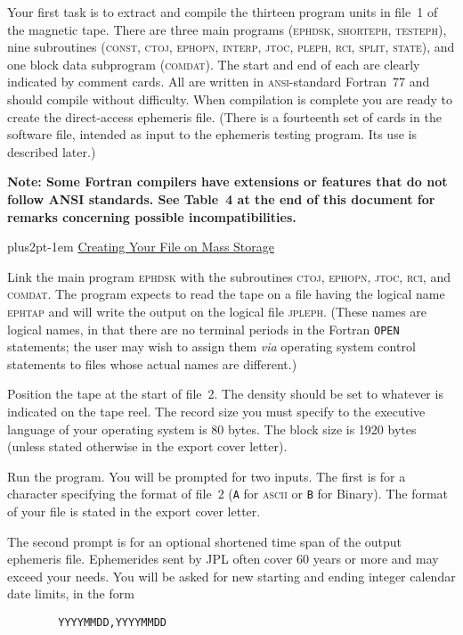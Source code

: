 \documentclass[twoside,11pt]{article}
\renewcommand{\_}{\texttt{\symbol{95}}}
\newcommand{\hdg}[1]{\vskip4pt plus2pt\leavevmode\kern-1em \underline{\large{#1}}\par}
\newcommand{\hdg}[1]{\subsection*{{#1}}}
\begin{document}
Your first task is to extract and compile the thirteen program
units in file~1 of the magnetic tape. There are three main programs
(\textsc{ephdsk, shorteph, testeph}), nine subroutines (\textsc{const,
ctoj, ephopn, interp, jtoc, pleph, rci, split, state}), and one block
data subprogram (\textsc{comdat}).  The start and end of each are clearly
indicated by comment cards. All are written in \textsc{ansi}-standard
Fortran~77 and should compile without difficulty. When compilation
is complete you are ready to create the direct-access ephemeris file.
(There is a fourteenth set of cards in the software file, intended as
input to the ephemeris testing program. Its use is described later.)

\textbf{Note: Some Fortran compilers have extensions or features that
do not follow ANSI standards. See Table~4 at the end of this document
for remarks concerning possible incompatibilities.}


\hdg{Creating Your File on Mass Storage}

Link the main program \textsc{ephdsk} with the subroutines \textsc{ctoj, ephopn,
jtoc, rci}, and \textsc{comdat}. The program expects to read the tape on a
file having the logical name \textsc{ephtap} and will write the output on the
logical file \textsc{jpleph}. (These names are logical names, in that there
are no terminal periods in the Fortran {\tt OPEN} statements; the user
may wish to assign them \emph{via} operating system control
statements to files whose actual names are different.)
 
Position the tape at the start of file~2.
The density should be set to whatever is indicated
on the tape reel. The record size you must specify to the
executive language of your operating system is 80 bytes. The
block size is 1920 bytes (unless stated otherwise in the export
cover letter).
 
Run the program.  You will be prompted for two inputs.  The first is for
a character specifying the format of file~2 ({\tt A} for \textsc{ascii}
or {\tt B} for Binary). The format of your file is stated in the export
cover letter.

The second prompt is for an optional shortened time span of the output
ephemeris file. Ephemerides sent by JPL often cover 60 years or more and
may exceed your needs.  You will be asked for new starting and ending
integer calendar date limits, in the form

\begin{verbatim}
        YYYYMMDD,YYYYMMDD
\end{verbatim}
 
\end{document}
